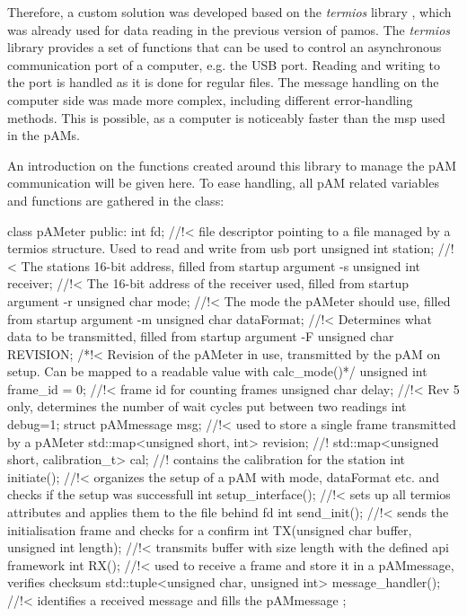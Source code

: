 Therefore, a custom solution was developed based on the \textit{termios} library \cite{termios}, which was already used for data reading in the previous version of \ac{pamos}. The \textit{termios} library provides a set of functions that can be used to control an asynchronous communication port of a computer, e.g. the USB port. Reading and writing to the port is handled as it is done for regular files. The message handling on the computer side was made more complex, including different error-handling methods. This is possible, as a computer is noticeably faster than the \ac{msp} used in the \acp{pAM}.

An introduction on the functions created around this library to manage the \ac{pAM} communication will be given here. To ease handling, all \ac{pAM} related variables and functions are gathered in the  class:
\begin{codecpp}[caption={pAMeter structure in the \ac{pamos} software. The structure contains all parameters that are necessary to allow flawless communication.}]
class pAMeter {
	public:
	int fd; //!< file descriptor pointing to a file managed by a termios structure. Used to read and write from usb port
	unsigned int station; //!< The stations 16-bit address, filled from startup argument -s
	unsigned int receiver; //!< The 16-bit address of the receiver used, filled from startup argument -r
	unsigned char mode; //!< The mode the pAMeter should use, filled from startup argument -m
	unsigned char dataFormat; //!< Determines what data to be transmitted, filled from startup argument -F
	unsigned char REVISION; /*!< Revision of the pAMeter in use, transmitted by the pAM on setup. Can be mapped to a readable value with calc_mode()*/
	unsigned int frame_id = 0; //!< frame id for counting frames
	unsigned char delay; //!< Rev 5 only, determines the number of wait cycles put between two readings
	int debug=1;
	struct pAMmessage msg; //!< used to store a single frame transmitted by a pAMeter
	std::map<unsigned short, int> revision; //!
	std::map<unsigned short, calibration_t> cal; //! contains the calibration for the station
	int initiate(); //!< organizes the setup of a pAM with mode, dataFormat etc. and checks if the setup was successfull
	int setup_interface(); //!< sets up all termios attributes and applies them to the file behind fd
	int send_init(); //!< sends the initialisation frame and checks for a confirm
	int TX(unsigned char buffer, unsigned int length); //!< transmits buffer with size length with the defined api framework
	int RX(); //!< used to receive a frame and store it in a pAMmessage, verifies checksum
	std::tuple<unsigned char, unsigned int> message_handler(); //!< identifies a received message and fills the pAMmessage 	
};
\end{codecpp}
